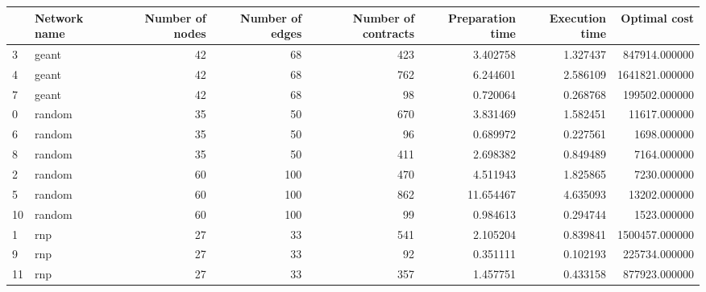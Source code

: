 \begin{tabular}{llrrrrrr}
\toprule
 & Network name & Number of nodes & Number of edges & Number of contracts & Preparation time & Execution time & Optimal cost \\
\midrule
3 & geant & 42 & 68 & 423 & 3.402758 & 1.327437 & 847914.000000 \\
4 & geant & 42 & 68 & 762 & 6.244601 & 2.586109 & 1641821.000000 \\
7 & geant & 42 & 68 & 98 & 0.720064 & 0.268768 & 199502.000000 \\
0 & random & 35 & 50 & 670 & 3.831469 & 1.582451 & 11617.000000 \\
6 & random & 35 & 50 & 96 & 0.689972 & 0.227561 & 1698.000000 \\
8 & random & 35 & 50 & 411 & 2.698382 & 0.849489 & 7164.000000 \\
2 & random & 60 & 100 & 470 & 4.511943 & 1.825865 & 7230.000000 \\
5 & random & 60 & 100 & 862 & 11.654467 & 4.635093 & 13202.000000 \\
10 & random & 60 & 100 & 99 & 0.984613 & 0.294744 & 1523.000000 \\
1 & rnp & 27 & 33 & 541 & 2.105204 & 0.839841 & 1500457.000000 \\
9 & rnp & 27 & 33 & 92 & 0.351111 & 0.102193 & 225734.000000 \\
11 & rnp & 27 & 33 & 357 & 1.457751 & 0.433158 & 877923.000000 \\
\bottomrule
\end{tabular}
